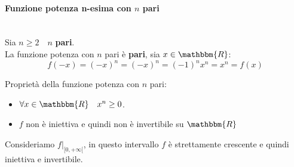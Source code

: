 \documentclass[12pt]{report}
\begin{document}
	\paragraph{Funzione potenza n-esima con $n$ pari} \quad \\
	Sia $n \geq 2 \quad n$ \textbf{pari}. \\
	La funzione potenza con $n$ pari è \textbf{pari}, sia $x \in \mathbbm{R}$:
	\[
	f(-x) = (-x)^n = (-x)^n = (-1)^nx^n = x^n = f(x)
	\]
	\begin{center}
	\end{center}
	Proprietà della funzione potenza con $n$ pari:
	\begin{itemize}
		\item $\forall x \in \mathbbm{R} \quad x^n \geq 0$.
		\item $f$ non è iniettiva e quindi non è invertibile su $\mathbbm{R}$
	\end{itemize}
	Consideriamo $f|_{[0, +\infty[}$, in questo intervallo $f$ è strettamente crescente e quindi iniettiva e invertibile.
\end{document}

